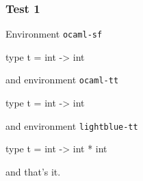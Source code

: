 \documentclass[compress]{beamer}
\begin{document}
\begin{frame}\frametitle{Test 1}

Environment \texttt{ocaml-sf}
\begin{ocaml}
  type t = int -> int
\end{ocaml}
and environment \texttt{ocaml-tt}
\begin{ocaml-tt}
  type t = int -> int
\end{ocaml-tt}
and environment \texttt{lightblue-tt}
\begin{lightblue-tt}
  type t = int -> int * int
\end{lightblue-tt}
and that's it.
\end{frame}
\end{document}
